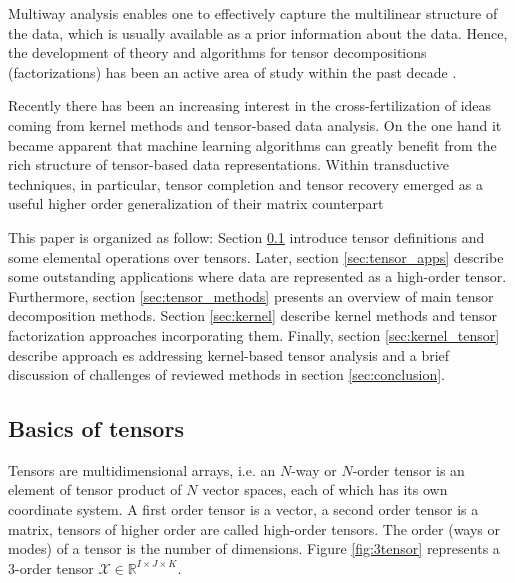 \documentclass[letterpaper,12pt]{article}
\begin{document}
Multiway analysis enables one to effectively capture the multilinear structure of the data, which is usually available as a prior information about the data. Hence, the development of theory and algorithms for tensor decompositions (factorizations) has been an active area of study within the past decade  \cite{Kolda2009,Cichocki2015}.

Recently there has been an increasing interest in the cross-fertilization of ideas coming from kernel methods and tensor-based data analysis. On the one hand it became apparent that machine learning algorithms can greatly benefit from the rich structure of tensor-based data representations. %
Within transductive techniques, in particular, tensor completion and tensor recovery emerged as a useful higher order generalization of their matrix counterpart %

This paper is organized as follow: Section \ref{sec:basic_tensors} introduce tensor definitions and some elemental operations over tensors. Later, section \ref{sec:tensor_apps} describe some outstanding applications where data are represented as a high-order tensor. Furthermore,  section \ref{sec:tensor_methods} presents an overview of main tensor decomposition  methods. Section \ref{sec:kernel} describe kernel methods and tensor factorization approaches incorporating them. Finally, section \ref{sec:kernel_tensor} describe approach	es addressing kernel-based tensor analysis and a brief discussion of challenges of reviewed methods in section \ref{sec:conclusion}.

\subsection{Basics of tensors}\label{sec:basic_tensors}

Tensors are multidimensional arrays, i.e. an $N$-way or $N$-order tensor is an element of tensor product of $N$ vector spaces, each of which has its own coordinate system. A first order tensor is a vector, a second order tensor is a matrix, tensors of higher order are called high-order tensors. The order (ways or modes) of a tensor is the number of dimensions. Figure \ref{fig:3tensor} represents a 3-order tensor $\mathcal{X}\in\mathbb{R}^{I\times J\times K}$.
\end{document}
